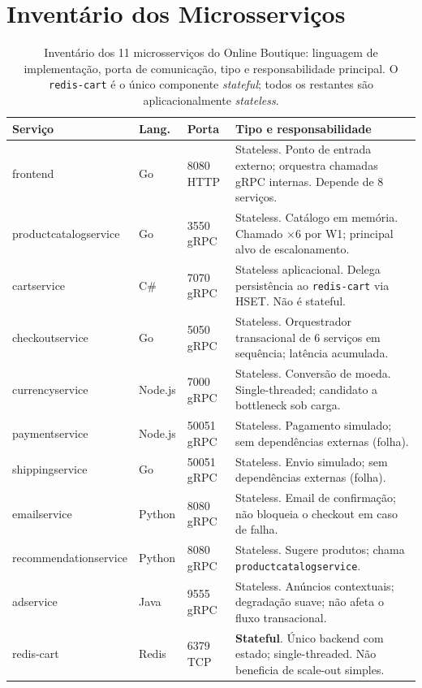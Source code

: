 \documentclass[manuscript,oneside]{acmart}
\begin{document}
\appendix

\section{Inventário dos Microsserviços}
\label{apx:inventario}

\begin{table}[H]
\caption{Inventário dos 11 microsserviços do Online Boutique: linguagem de implementação, porta de comunicação, tipo e responsabilidade principal. O \texttt{redis-cart} é o único componente \textit{stateful}; todos os restantes são aplicacionalmente \textit{stateless}.}
\label{tab:inventario}
\begin{tabularx}{\columnwidth}{p{2.5cm}p{1.1cm}p{1.8cm}X}
\toprule
\textbf{Serviço} & \textbf{Lang.} & \textbf{Porta} & \textbf{Tipo e responsabilidade} \\
\midrule
frontend              & Go      & 8080 HTTP      & Stateless. Ponto de entrada externo; orquestra chamadas gRPC internas. Depende de 8 serviços. \\
productcatalogservice & Go      & 3550 gRPC      & Stateless. Catálogo em memória. Chamado ×6 por W1; principal alvo de escalonamento. \\
cartservice           & C\#     & 7070 gRPC      & Stateless aplicacional. Delega persistência ao \texttt{redis-cart} via HSET. Não é stateful. \\
checkoutservice       & Go      & 5050 gRPC      & Stateless. Orquestrador transacional de 6 serviços em sequência; latência acumulada. \\
currencyservice       & Node.js & 7000 gRPC      & Stateless. Conversão de moeda. Single-threaded; candidato a bottleneck sob carga. \\
paymentservice        & Node.js & 50051 gRPC     & Stateless. Pagamento simulado; sem dependências externas (folha). \\
shippingservice       & Go      & 50051 gRPC     & Stateless. Envio simulado; sem dependências externas (folha). \\
emailservice          & Python  & 8080 gRPC      & Stateless. Email de confirmação; não bloqueia o checkout em caso de falha. \\
recommendationservice & Python  & 8080 gRPC      & Stateless. Sugere produtos; chama \texttt{productcatalogservice}. \\
adservice             & Java    & 9555 gRPC      & Stateless. Anúncios contextuais; degradação suave; não afeta o fluxo transacional. \\
redis-cart            & Redis   & 6379 TCP       & \textbf{Stateful}. Único backend com estado; single-threaded. Não beneficia de scale-out simples. \\
\bottomrule
\end{tabularx}
\end{table}
\end{document}
